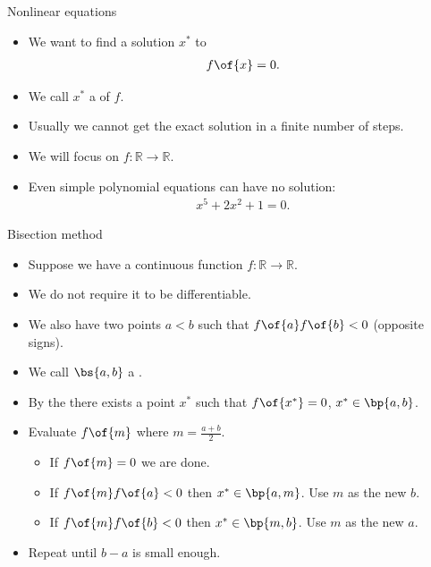 \documentclass[11pt,xcolor={dvipsnames},aspectratio=159,hyperref={pdftex,pdfpagemode=UseNone,hidelinks,pdfdisplaydoctitle=true},usepdftitle=false]{beamer}
\begin{document}
    \begin{frame}
        \end{frame}

    \begin{frame}{Nonlinear equations}
      
        \begin{itemize}
        
            \item We want to find a solution $x^*$ to 
    \begin{align*}
       f\of{x} = 0.
    \end{align*}
    \item We call $x^*$ a  of $f$.
    \item Usually we cannot get the exact solution in a finite number of steps. 
    \item We will focus on $f:\mathbb{R} \rightarrow \mathbb{R}$.
    \item Even simple polynomial equations can have no  solution: \begin{align*}
        x^5 + 2x^2  + 1= 0.
    \end{align*}
\end{itemize}
    \end{frame}

    \begin{frame}{Bisection method}
      
        \begin{itemize}
        
            \item Suppose we have a continuous function $f:\mathbb{R} \rightarrow \mathbb{R}$.
            \item We do not require it to be differentiable.
            \item We also have two points $a<b$ such that $f\of{a}f\of{b} < 0$ (opposite signs).
            \item We call $\bs{a,b}$ a . 
            \item By the  there exists a point $x^*$ such that $f\of{x^*} = 0$, $x^* \in \bp{a,b}$.
            \item Evaluate $f\of{m}$ where $m = \frac{a+b}{2}$. 
            \begin{itemize}
                \item If $f\of{m} = 0$ we are done.
                \item If $f\of{m}f\of{a} < 0$ then $x^* \in \bp{a,m}$. Use $m$ as the new $b$.
                \item If $f\of{m}f\of{b} < 0$ then $x^* \in \bp{m,b}$. Use $m$ as the new $a$.
            \end{itemize}
            \item Repeat until $b-a$ is small enough.
\end{itemize}
    \end{frame}
\end{document}
